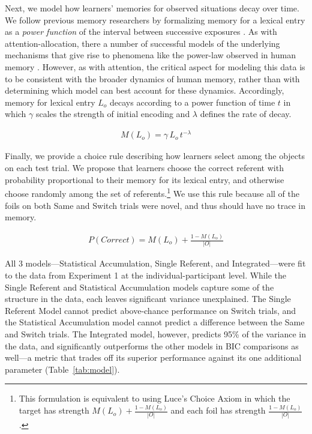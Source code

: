 \documentclass{pnastwo}
\begin{document}
\begin{article}
Next, we model how learners' memories for observed situations decay over time. We follow previous memory researchers by formalizing memory for a lexical entry as a \emph{power function} of the interval between successive exposures \citep{Anderson1991a}. As with attention-allocation, there a number of successful models of the underlying mechanisms that give rise to phenomena like the power-law observed in human memory \citep[e.g.,][]{Murdock1982, Shiffrin1997}. However, as with attention, the critical aspect for modeling this data is to be consistent with the broader dynamics of human memory, rather than with determining which model can best account for these dynamics. Accordingly, memory for lexical entry $L_{o}$ decays according to a power function of time $t$ in which $\gamma$ scales the strength of initial encoding and $\lambda$ defines the rate of decay.

\begin{align}
M(L_{o}) = \gamma \, L_{o} \, t^{-\lambda}
\end{align}

Finally, we provide a choice rule describing how learners select among the objects on each test trial. We propose that learners choose the correct referent with probability proportional to their memory for its lexical entry, and otherwise choose randomly among the set of referents.\footnote{This formulation is equivalent to using Luce's Choice Axiom \citep{Luce1959} in which the target has strength  $M(L_{o}) + \frac{1-M(L_{o})}{|O|}$ and each foil has strength $\frac{1-M(L_{o})}{|O|}$.} We use this rule because all of the foils on both Same and Switch trials were novel, and thus should have no trace in memory.

\begin{align}
P(Correct) = M(L_{o}) + \frac{1-M(L_{o})}{|O|}
\end{align}

All 3 models---Statistical Accumulation, Single Referent, and Integrated---were fit to the data from Experiment 1 at the individual-participant level. While the Single Referent and Statistical Accumulation models capture some of the structure in the data, each leaves significant variance unexplained. The Single Referent Model cannot predict above-chance performance on Switch trials, and the Statistical Accumulation model cannot predict a difference between the Same and Switch trials. The Integrated model, however, predicts 95\% of the variance in the data, and significantly outperforms the other models in BIC comparisons as well---a metric that trades off its superior performance against its one additional parameter (Table~\ref{tab:model}).


\end{article}
\end{document}
